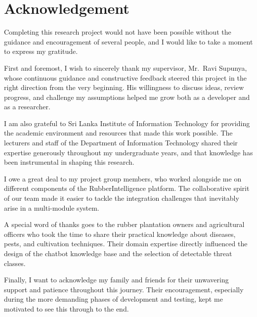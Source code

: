 \chapter*{Acknowledgement}

Completing this research project would not have been possible without the guidance and encouragement of several people, and I would like to take a moment to express my gratitude.

First and foremost, I wish to sincerely thank my supervisor, Mr.\ Ravi Supunya, whose continuous guidance and constructive feedback steered this project in the right direction from the very beginning. His willingness to discuss ideas, review progress, and challenge my assumptions helped me grow both as a developer and as a researcher.

I am also grateful to Sri Lanka Institute of Information Technology for providing the academic environment and resources that made this work possible. The lecturers and staff of the Department of Information Technology shared their expertise generously throughout my undergraduate years, and that knowledge has been instrumental in shaping this research.

I owe a great deal to my project group members, who worked alongside me on different components of the RubberIntelligence platform. The collaborative spirit of our team made it easier to tackle the integration challenges that inevitably arise in a multi-module system.

A special word of thanks goes to the rubber plantation owners and agricultural officers who took the time to share their practical knowledge about diseases, pests, and cultivation techniques. Their domain expertise directly influenced the design of the chatbot knowledge base and the selection of detectable threat classes.

Finally, I want to acknowledge my family and friends for their unwavering support and patience throughout this journey. Their encouragement, especially during the more demanding phases of development and testing, kept me motivated to see this through to the end.

\newpage
